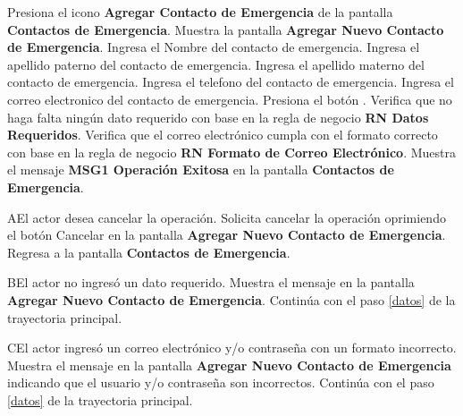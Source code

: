  \begin{UCtrayectoria}
 	
 	\UCpaso [\UCactor] Presiona el icono \textbf{Agregar Contacto de Emergencia} de la pantalla \textbf{Contactos de Emergencia}.
 	\UCpaso Muestra la pantalla \textbf{Agregar Nuevo Contacto de Emergencia}.
 	\UCpaso [\UCactor] Ingresa el Nombre del contacto de emergencia. \label{datos}
 	\UCpaso [\UCactor] Ingresa el apellido paterno del contacto de emergencia.
 	\UCpaso [\UCactor] Ingresa el apellido materno del contacto de emergencia.
 	\UCpaso [\UCactor] Ingresa el telefono del contacto de emergencia.
 	\UCpaso [\UCactor] Ingresa el correo electronico del contacto de emergencia.
 	\UCpaso [\UCactor] Presiona el botón . 
	\UCpaso Verifica que no haga falta ningún dato requerido con base en la regla de negocio \textbf{RN Datos Requeridos}. 
	\UCpaso Verifica que el correo electrónico cumpla con el formato correcto con base en la regla de negocio \textbf{RN Formato de Correo Electrónico}.
	\UCpaso Muestra el mensaje \textbf{MSG1 Operación Exitosa} en la pantalla \textbf{Contactos de Emergencia}.
    
 \end{UCtrayectoria}

 \begin{UCtrayectoriaA}{A}{El actor desea cancelar la operación.}
    \UCpaso[\UCactor] Solicita cancelar la operación oprimiendo el botón Cancelar en la pantalla \textbf{Agregar Nuevo Contacto de Emergencia}.
   \UCpaso Regresa a la pantalla \textbf{Contactos de Emergencia}.
 \end{UCtrayectoriaA}
 
 \begin{UCtrayectoriaA}{B}{El actor no ingresó un dato requerido.}
    \UCpaso[\UCsist] Muestra el mensaje  en la pantalla \textbf{Agregar Nuevo Contacto de Emergencia}.
    \UCpaso[] Continúa con el paso \ref{datos} de la trayectoria principal.
 \end{UCtrayectoriaA}
 
 \begin{UCtrayectoriaA}{C}{El actor ingresó un correo electrónico y/o contraseña con un formato incorrecto.}
    \UCpaso[\UCsist] Muestra el mensaje  en la pantalla \textbf{Agregar Nuevo Contacto de Emergencia} indicando que el usuario y/o contraseña son incorrectos.
    \UCpaso[] Continúa con el paso \ref{datos} de la trayectoria principal.
 \end{UCtrayectoriaA} 


 


